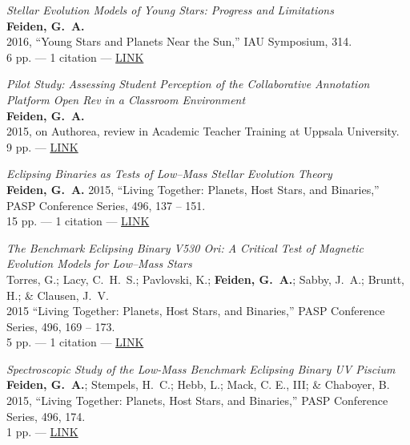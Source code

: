 \documentclass[12pt,letter]{article}
\begin{document}
\begin{etaremune}[leftmargin=0.30in]
	\item \emph{Stellar Evolution Models of Young Stars: Progress and Limitations} \\
	{\bf Feiden, G.~A.} \\
	2016, ``Young Stars and Planets Near the Sun,'' IAU Symposium, 314. \\
	6 pp. --- 1 citation --- \href{http://adsabs.harvard.edu/abs/2015IAUS..314...79F}{LINK}

	\item \emph{Pilot Study: Assessing Student Perception of the Collaborative Annotation Platform
	{\rm Open Rev} in a Classroom Environment} \\
	{\bf Feiden, G.~A.} \\
	2015, on Authorea, review in Academic Teacher Training at Uppsala University. \\
	9 pp. --- \href{https://www.authorea.com/users/18170/articles/20333/}{LINK}

	\item \emph{Eclipsing Binaries as Tests of Low--Mass Stellar Evolution Theory} \\
	{\bf Feiden, G.~A.} 
	2015, ``Living Together: Planets, Host Stars, and Binaries,'' PASP Conference Series, 496, 137 -- 151. \\
	15 pp. --- 1 citation --- \href{http://adsabs.harvard.edu/abs/2015ASPC..496..137F}{LINK}
	
	\item \emph{The Benchmark Eclipsing Binary V530 Ori: A Critical Test of Magnetic Evolution 
	            Models for Low--Mass Stars} \\
	Torres, G.; Lacy, C.~H.~S.; Pavlovski, K.; {\bf Feiden, G.~A.}; Sabby, J.~A.; Bruntt, H.; \& Clausen, J.~V. \\
	2015 ``Living Together: Planets, Host Stars, and Binaries,'' PASP Conference Series, 496, 169 -- 173. \\
	5 pp. --- 1 citation --- \href{http://adsabs.harvard.edu/abs/2015ASPC..496..169T}{LINK}
	
	\item \emph{Spectroscopic Study of the Low-Mass Benchmark Eclipsing Binary UV Piscium} \\
	{\bf Feiden, G.~A.}; Stempels, H.~C.; Hebb, L.; Mack, C. E., III; \& Chaboyer, B. \\
	2015, ``Living Together: Planets, Host Stars, and Binaries,'' PASP Conference Series, 496, 174. \\
	1 pp. --- \href{http://adsabs.harvard.edu/abs/2015ASPC..496..174F}{LINK}
	

\end{etaremune}
\end{document}

